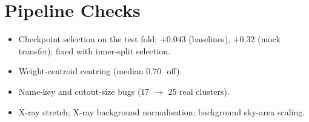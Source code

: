 \section{Pipeline Checks}
\label{app:audit}
\begin{itemize}
  \item Checkpoint selection on the test fold: $+0.043$ (baselines),
        $+0.32$ (mock transfer); fixed with inner-split selection.
  \item Weight-centroid centring (median 0.70\,\rfive\ off).
  \item Name-key and cutout-size bugs (17 $\to$ 25 real clusters).
  \item X-ray stretch; X-ray background normalisation; background sky-area
        scaling.
\end{itemize}
